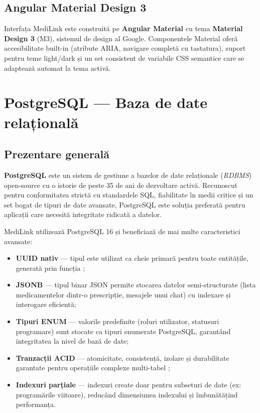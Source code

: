 \subsection{Angular Material Design 3}

Interfața MediLink este construită pe \textbf{Angular Material} \cite{angularmaterial2024} cu tema \textbf{Material Design 3} (M3), sistemul de design al Google. Componentele Material oferă accesibilitate built-in (atribute ARIA, navigare completă cu tastatura), suport pentru teme light/dark și un set consistent de variabile CSS semantice care se adaptează automat la tema activă.

\section{PostgreSQL --- Baza de date relațională}

\subsection{Prezentare generală}

\textbf{PostgreSQL} \cite{postgresql2024} este un sistem de gestiune a bazelor de date relaționale (\textit{RDBMS}) open-source cu o istorie de peste 35 de ani de dezvoltare activă. Recunoscut pentru conformitatea strictă cu standardele SQL, fiabilitate în medii critice și un set bogat de tipuri de date avansate, PostgreSQL este soluția preferată pentru aplicații care necesită integritate ridicată a datelor.

MediLink utilizează PostgreSQL 16 și beneficiază de mai multe caracteristici avansate:

\begin{itemize}
  \item \textbf{UUID nativ} --- tipul  este utilizat ca cheie primară pentru toate entitățile, generată prin funcția ;
  \item \textbf{JSONB} --- tipul binar JSON permite stocarea datelor semi-structurate (lista medicamentelor dintr-o prescripție, mesajele unui chat) cu indexare și interogare eficientă;
  \item \textbf{Tipuri ENUM} --- valorile predefinite (roluri utilizator, statusuri programare) sunt stocate ca tipuri enumerate PostgreSQL, garantând integritatea la nivel de bază de date;
  \item \textbf{Tranzacții ACID} --- atomicitate, consistență, izolare și durabilitate garantate pentru operațiile complexe multi-tabel \cite{kleppmann2017data};
  \item \textbf{Indexuri parțiale} --- indexuri create doar pentru subseturi de date (ex: programările viitoare), reducând dimensiunea indexului și îmbunătățind performanța.
\end{itemize}

